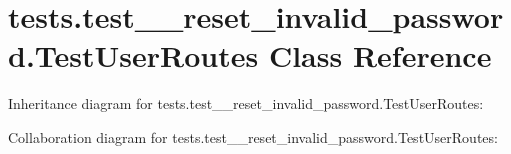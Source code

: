 \hypertarget{classtests_1_1test__6__reset__invalid__password_1_1_test_user_routes}{}\section{tests.\+test\+\_\+\_\+reset\+\_\+invalid\+\_\+password.\+Test\+User\+Routes Class Reference}
\label{classtests_1_1test__6__reset__invalid__password_1_1_test_user_routes}


Inheritance diagram for tests.\+test\+\_\+\_\+reset\+\_\+invalid\+\_\+password.\+Test\+User\+Routes\+:


Collaboration diagram for tests.\+test\+\_\+\_\+reset\+\_\+invalid\+\_\+password.\+Test\+User\+Routes\+:

